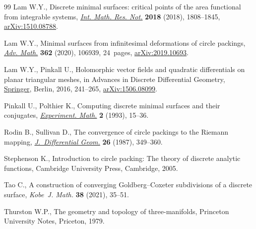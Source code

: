 \documentclass[pdftex]{sigma}
\newcommand{\1}{{\bf 1}}
\numberwithin{equation}{section}
\begin{document}
\begin{thebibliography}{99}
Lam W.Y., Discrete minimal surfaces: critical points of the area functional
  from integrable systems, \href{https://doi.org/10.1093/imrn/rnw267}{\textit{Int. Math. Res. Not.}} \textbf{2018} (2018),
  1808--1845, \href{https://arxiv.org/abs/1510.08788}{arXiv:1510.08788}.

Lam W.Y., Minimal surfaces from infinitesimal deformations of circle packings,
  \href{https://doi.org/10.1016/j.aim.2019.106939}{\textit{Adv. Math.}} \textbf{362} (2020), 106939, 24~pages,
  \href{https://arxiv.org/abs/2019.10693}{arXiv:2019.10693}.

Lam W.Y., Pinkall U., Holomorphic vector fields and quadratic differentials on
  planar triangular meshes, in Advances in {D}iscrete {D}ifferential
  {G}eometry,  \href{https://doi.org/10.1007/978-3-662-50447-5_7}{Springer}, Berlin, 2016, 241--265, \href{https://arxiv.org/abs/1506.08099}{arXiv:1506.08099}.

Pinkall U., Polthier K., Computing discrete minimal surfaces and their
  conjugates,  \href{https://doi.org/10.1080/10586458.1993.10504266}{\textit{Experiment. Math.}} \textbf{2} (1993), 15--36.

Rodin B., Sullivan D., The convergence of circle packings to the {R}iemann
  mapping,  \href{https://doi.org/10.4310/jdg/1214441375}{\textit{J.~Differential Geom.}} \textbf{26} (1987), 349--360.

Stephenson K., Introduction to circle packing: {T}he theory of discrete
  analytic functions, Cambridge University Press, Cambridge, 2005.

Tao C., A construction of converging {G}oldberg--{C}oxeter subdivisions of a
  discrete surface, \textit{Kobe~J. Math.} \textbf{38} (2021), 35--51.

Thurston W.P., The geometry and topology of three-manifolds, Princeton
  University Notes, Priceton, 1979.

\end{thebibliography}\LastPageEnding
\end{document}
